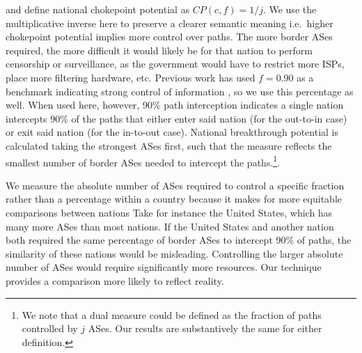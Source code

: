 and define national chokepoint potential as $CP(c,f) = 1/j$. We use the
multiplicative inverse here to preserve a clearer semantic meaning i.e.\ higher
chokepoint potential implies more control over paths. The more border ASes
required, the more difficult it would likely be for that nation to perform
censorship or surveillance, as the government would have to restrict more ISPs,
place more filtering hardware, etc. 
Previous work has used $f=0.90$ as a benchmark indicating strong control of information
\cite{throats}, so we use this percentage as well. When used here, however,
90\% path interception indicates a single nation intercepts 90\% of the paths
that either enter said nation (for the out-to-in case) or exit said nation (for
the in-to-out case). National breakthrough potential is calculated taking the
strongest ASes first, such that the measure reflects the smallest number of
border ASes needed to intercept the paths.\footnote{We note that a dual measure
could be defined as the fraction of paths controlled by $j$ ASes. Our results
are substantively the same for either definition.}. 

We measure the absolute number of ASes required to control a specific
fraction rather than a percentage within a country because it makes for more
equitable comparisons between nations
Take for instance the United States, which has many more ASes than
most nations. If the United States and another nation both required the same
percentage of border ASes to intercept 90\% of paths, the similarity of these
nations would be misleading. Controlling the larger absolute number of ASes
would require significantly more resources. Our technique provides a comparison more likely to
reflect reality. 
